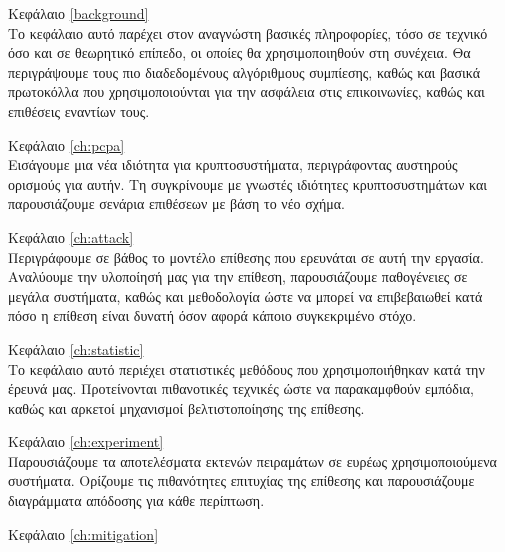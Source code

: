 \begin{description} \item{Κεφάλαιο \ref{background}} \hfill \\

Το κεφάλαιο αυτό παρέχει στον αναγνώστη βασικές πληροφορίες, τόσο σε τεχνικό όσο
και σε θεωρητικό επίπεδο, οι οποίες θα χρησιμοποιηθούν στη συνέχεια.
Θα περιγράψουμε τους πιο διαδεδομένους αλγόριθμους συμπίεσης, καθώς και βασικά
πρωτοκόλλα που χρησιμοποιούνται για την ασφάλεια στις επικοινωνίες, καθώς και
επιθέσεις εναντίων τους.\hfill \\

\item{Κεφάλαιο \ref{ch:pcpa}} \hfill \\

Εισάγουμε μια νέα ιδιότητα για κρυπτοσυστήματα, περιγράφοντας αυστηρούς ορισμούς
για αυτήν. Τη συγκρίνουμε με γνωστές ιδιότητες κρυπτοσυστημάτων και
παρουσιάζουμε σενάρια επιθέσεων με βάση το νέο σχήμα.\hfill \\

\item{Κεφάλαιο \ref{ch:attack}} \hfill \\

Περιγράφουμε σε βάθος το μοντέλο επίθεσης που ερευνάται σε αυτή την εργασία.
Αναλύουμε την υλοποίησή μας για την επίθεση, παρουσιάζουμε παθογένειες σε μεγάλα
συστήματα, καθώς και μεθοδολογία ώστε να μπορεί να επιβεβαιωθεί κατά πόσο η
επίθεση είναι δυνατή όσον αφορά κάποιο συγκεκριμένο στόχο.\hfill \\

\item{Κεφάλαιο \ref{ch:statistic}} \hfill \\

Το κεφάλαιο αυτό περιέχει στατιστικές μεθόδους που χρησιμοποιήθηκαν κατά την
έρευνά μας. Προτείνονται πιθανοτικές τεχνικές ώστε να παρακαμφθούν εμπόδια,
καθώς και αρκετοί μηχανισμοί βελτιστοποίησης της επίθεσης.\hfill \\

\item{Κεφάλαιο \ref{ch:experiment}} \hfill \\

Παρουσιάζουμε τα αποτελέσματα εκτενών πειραμάτων σε ευρέως χρησιμοποιούμενα
συστήματα. Ορίζουμε τις πιθανότητες επιτυχίας της επίθεσης και παρουσιάζουμε
διαγράμματα απόδοσης για κάθε περίπτωση.\hfill \\

\item{Κεφάλαιο \ref{ch:mitigation}} \hfill \\


\end{description}
